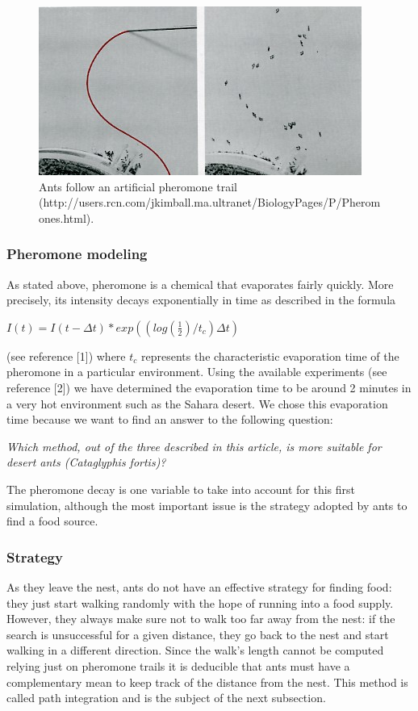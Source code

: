 \documentclass[11pt]{article}
\begin{document}
\begin{figure}[h!]
  \centering
    \includegraphics[width=.7\textwidth]{images/TrailPheromone.jpg}
     \caption{Ants follow an artificial pheromone trail (http://users.rcn.com/jkimball.ma.ultranet/BiologyPages/P/Pheromones.html).}
\end{figure}

\subsubsection{Pheromone modeling}
As stated above, pheromone is a chemical that evaporates fairly quickly. More precisely, its intensity decays exponentially in time as described in the formula
\begin{center}
$I(t)=I(t-\Delta t)*exp((log(\frac{1}{2})/t_c)\Delta t)$
\end{center}
(see reference [1])
where $t_c$ represents the characteristic evaporation time of the pheromone in a particular environment. Using the available experiments (see reference [2]) we have determined the evaporation time to be around 2 minutes in a very hot environment such as the Sahara desert. We chose this evaporation time because we want to find an answer to the following question:
\begin{center}
\emph{Which method, out of the three described in this article, is more suitable for desert ants (Cataglyphis fortis)?}
\end{center}

The pheromone decay is one variable to take into account for this first simulation, although the most important issue is the strategy adopted by ants to find a food source.

\subsubsection{Strategy}
As they leave the nest, ants do not have an effective strategy for finding food: they just start walking randomly with the hope of running into a food supply. However, they always make sure not to walk too far away from the nest: if the search is unsuccessful for a given distance, they go back to the nest and start walking in a different direction. Since the walk's length cannot be computed relying just on pheromone trails it is deducible that ants must have a complementary mean to keep track of the distance from the nest. This method is called path integration and is the subject of the next subsection.
\end{document}
